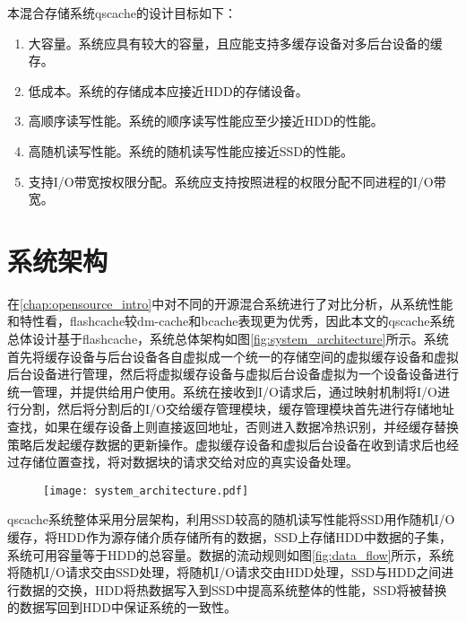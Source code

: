 本混合存储系统qscache的设计目标如下：

\begin{enumerate}
    \item 大容量。系统应具有较大的容量，且应能支持多缓存设备对多后台设备的缓存。
    \item 低成本。系统的存储成本应接近HDD的存储设备。
    \item 高顺序读写性能。系统的顺序读写性能应至少接近HDD的性能。
    \item 高随机读写性能。系统的随机读写性能应接近SSD的性能。
    \item 支持I/O带宽按权限分配。系统应支持按照进程的权限分配不同进程的I/O带宽。

\end{enumerate}

\section{系统架构}
\label{sec:qscache_architecture}

在\ref{chap:opensource_intro}中对不同的开源混合系统进行了对比分析，从系统性能和特性看，flashcache较dm-cache和bcache表现更为优秀，因此本文的qscache系统总体设计基于flashcache，系统总体架构如图\ref{fig:system_architecture}所示。系统首先将缓存设备与后台设备各自虚拟成一个统一的存储空间的虚拟缓存设备和虚拟后台设备进行管理，然后将虚拟缓存设备与虚拟后台设备虚拟为一个设备设备进行统一管理，并提供给用户使用。系统在接收到I/O请求后，通过映射机制将I/O进行分割，然后将分割后的I/O交给缓存管理模块，缓存管理模块首先进行存储地址查找，如果在缓存设备上则直接返回地址，否则进入数据冷热识别，并经缓存替换策略后发起缓存数据的更新操作。虚拟缓存设备和虚拟后台设备在收到请求后也经过存储位置查找，将对数据块的请求交给对应的真实设备处理。

\begin{figure}[H]
    \centering
    \texttt{[image: system\_architecture.pdf]}
\end{figure}

qscache系统整体采用分层架构，利用SSD较高的随机读写性能将SSD用作随机I/O缓存，将HDD作为源存储介质存储所有的数据，SSD上存储HDD中数据的子集，系统可用容量等于HDD的总容量。数据的流动规则如图\ref{fig:data_flow}所示，系统将随机I/O请求交由SSD处理，将随机I/O请求交由HDD处理，SSD与HDD之间进行数据的交换，HDD将热数据写入到SSD中提高系统整体的性能，SSD将被替换的数据写回到HDD中保证系统的一致性。

